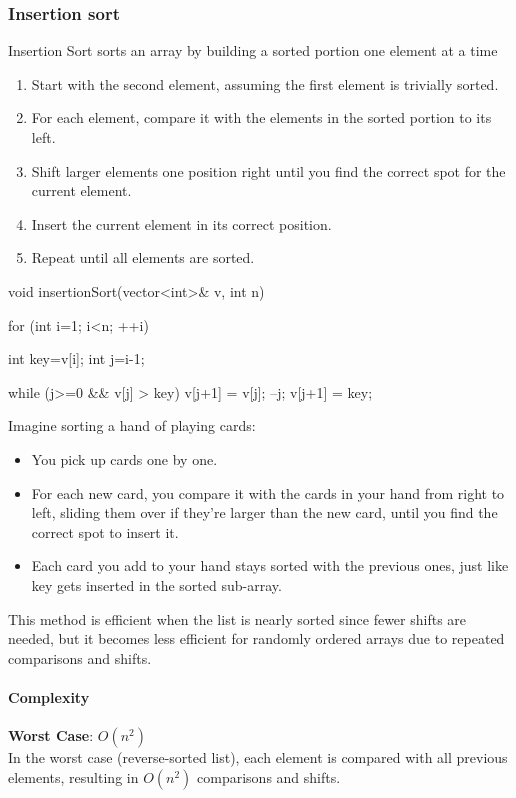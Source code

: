 \documentclass{report}
\begin{document}
\subsubsection{Insertion sort}
\bigbreak \noindent 
Insertion Sort sorts an array by building a sorted portion one element at a time
\bigbreak \noindent 
\begin{enumerate}
    \item Start with the second element, assuming the first element is trivially sorted.
    \item For each element, compare it with the elements in the sorted portion to its left.
    \item Shift larger elements one position right until you find the correct spot for the current element.
    \item Insert the current element in its correct position.
    \item Repeat until all elements are sorted.
\end{enumerate}
\bigbreak \noindent 
\begin{cppcode}
    void insertionSort(vector<int>& v, int n) {
        for (int i=1; i<n; ++i) {
            int key=v[i];
            int j=i-1;

        while (j>=0 && v[j] > key) {
            v[j+1] = v[j];
            --j;
        }
        v[j+1] = key;
    }
}
\end{cppcode}
\bigbreak \noindent 
Imagine sorting a hand of playing cards:
\begin{itemize}
    \item You pick up cards one by one.
    \item For each new card, you compare it with the cards in your hand from right to left, sliding them over if they’re larger than the new card, until you find the correct spot to insert it.
    \item Each card you add to your hand stays sorted with the previous ones, just like key gets inserted in the sorted sub-array.
\end{itemize}
This method is efficient when the list is nearly sorted since fewer shifts are needed, but it becomes less efficient for randomly ordered arrays due to repeated comparisons and shifts.

\pagebreak 
\paragraph{Complexity}
\bigbreak \noindent \bigbreak \noindent 
\textbf{Worst Case}: \( O(n^2) \) \\
\bigbreak \noindent 
In the worst case (reverse-sorted list), each element is compared with all previous elements, resulting in \( O(n^2) \) comparisons and shifts.
\end{document}
